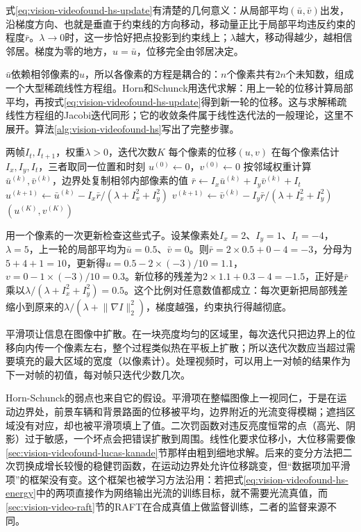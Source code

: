 式\eqref{eq:vision-videofound-hs-update}有清楚的几何意义：从局部平均$(\bar u,\bar v)$出发，沿梯度方向、也就是垂直于约束线的方向移动，移动量正比于局部平均违反约束的程度$\bar r$。$\lambda\to0$时，这一步恰好把点投影到约束线上；$\lambda$越大，移动得越少，越相信邻居。梯度为零的地方，$u=\bar u$，位移完全由邻居决定。

$\bar u$依赖相邻像素的$u$，所以各像素的方程是耦合的：$n$个像素共有$2n$个未知数，组成一个大型稀疏线性方程组。Horn和Schunck用迭代求解：用上一轮的位移计算局部平均，再按式\eqref{eq:vision-videofound-hs-update}得到新一轮的位移。这与求解稀疏线性方程组的Jacobi迭代同形；它的收敛条件属于线性迭代法的一般理论，这里不展开。算法\ref{alg:vision-videofound-hs}写出了完整步骤。

\begin{algorithm}
  \label{alg:vision-videofound-hs}
  \begin{algorithmic}[1]
    \Require 两帧$I_t,I_{t+1}$，权重$\lambda>0$，迭代次数$K$
    \Ensure 每个像素的位移$(u,v)$
    \State 在每个像素估计$I_x,I_y,I_t$，三者取同一位置和时刻
    \State $u^{(0)}\gets0$，$v^{(0)}\gets0$
      \State 按邻域权重计算$\bar u^{(k)},\bar v^{(k)}$，边界处复制相邻内部像素的值
      \State $\bar r\gets I_x\bar u^{(k)}+I_y\bar v^{(k)}+I_t$
      \State $u^{(k+1)}\gets\bar u^{(k)}-I_x\bar r/(\lambda+I_x^2+I_y^2)$
      \State $v^{(k+1)}\gets\bar v^{(k)}-I_y\bar r/(\lambda+I_x^2+I_y^2)$
    \EndFor
    \State \Return $(u^{(K)},v^{(K)})$
  \end{algorithmic}
\end{algorithm}

用一个像素的一次更新检查这些式子。设某像素处$I_x=2$、$I_y=1$、$I_t=-4$，$\lambda=5$，上一轮的局部平均为$\bar u=0.5$、$\bar v=0$。则$\bar r=2\times0.5+0-4=-3$，分母为$5+4+1=10$，更新得$u=0.5-2\times(-3)/10=1.1$，$v=0-1\times(-3)/10=0.3$。新位移的残差为$2\times1.1+0.3-4=-1.5$，正好是$\bar r$乘以$\lambda/(\lambda+I_x^2+I_y^2)=0.5$。这个比例对任意数值都成立：每次更新把局部残差缩小到原来的$\lambda/(\lambda+\lVert\nabla I\rVert_2^2)$，梯度越强，约束执行得越彻底。

平滑项让信息在图像中扩散。在一块亮度均匀的区域里，每次迭代只把边界上的位移向内传一个像素左右，整个过程类似热在平板上扩散；所以迭代次数应当超过需要填充的最大区域的宽度（以像素计）。处理视频时，可以用上一对帧的结果作为下一对帧的初值，每对帧只迭代少数几次。

Horn-Schunck的弱点也来自它的假设。平滑项在整幅图像上一视同仁，于是在运动边界处，前景车辆和背景路面的位移被平均，边界附近的光流变得模糊；遮挡区域没有对应，却也被平滑项填上了值。二次罚函数对违反亮度恒常的点（高光、阴影）过于敏感，一个坏点会把错误扩散到周围。线性化要求位移小，大位移需要像\ref{sec:vision-videofound-lucas-kanade}节那样由粗到细地求解。后来的变分方法把二次罚换成增长较慢的稳健罚函数，在运动边界处允许位移跳变，但“数据项加平滑项”的框架没有变。这个框架也被学习方法沿用：若把式\eqref{eq:vision-videofound-hs-energy}中的两项直接作为网络输出光流的训练目标，就不需要光流真值，而\ref{sec:vision-video-raft}节的RAFT在合成真值上做监督训练，二者的监督来源不同。

